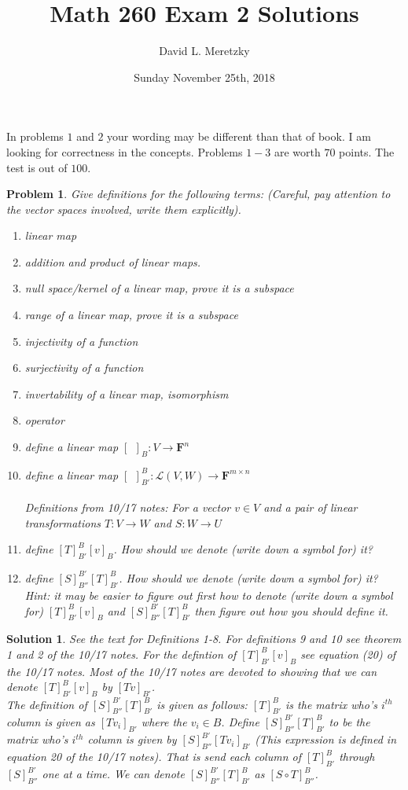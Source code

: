 \documentclass{article}
\title{ \vspace{-10ex} %
Math 260 Exam 2 Solutions
}
\author{David L. Meretzky
}
\date{%
Sunday November 25th, 2018
}
\theoremstyle{problemstyle}
\newtheorem{problem}{Problem}
\theoremstyle{problemstyle}
\newtheorem{solution}{Solution}
\theoremstyle{problemstyle}
\begin{document}
\maketitle

In problems $1$ and $2$ your wording may be different than that of book. I am looking for correctness in the concepts. Problems $1-3$ are worth $70$ points.  The test is out of $100$. 

\begin{problem}
Give definitions for the following terms: (Careful, pay attention to the vector spaces involved, write them explicitly). 
\begin{enumerate}
\item linear map
\item addition and product of linear maps.    
\item null space/kernel of a linear map, prove it is a subspace
\item range of a linear map, prove it is a subspace
\item injectivity of a function
\item surjectivity of a function
\item invertability of a linear map, isomorphism
\item operator
\item define a linear map $[ \ \ ]_B:V \rightarrow \textbf{F}^n$ 
\item define a linear map $[ \ \ ]_{B'}^B:\mathscr{L}(V,W) \rightarrow \textbf{F}^{m\times n}$\\\\
Definitions from 10/17 notes: For a vector $v \in V$ and a pair of linear transformations $T:V \rightarrow W$ and $S:W\rightarrow U$\\
\item define $[T]_{B'}^B[v]_B$. How should we denote (write down a symbol for) it?
\item define $[S]_{B''}^{B'}[T]_{B'}^B$. How should we denote (write down a symbol for) it?
Hint: it may be easier to figure out first how to denote (write down a symbol for) $[T]_{B'}^B[v]_B$ and $[S]_{B''}^{B'}[T]_{B'}^B$ then figure out how you should define it. 
\end{enumerate}
\end{problem}

\begin{solution}
See the text for Definitions 1-8. For definitions 9 and 10 see theorem 1 and 2 of the 10/17 notes. For the defintion of $[T]_{B'}^B[v]_B$ see equation (20) of the 10/17 notes. Most of the 10/17 notes are devoted to showing that we can denote $[T]_{B'}^B[v]_B$ by $[Tv]_{B'}$.\\

The definition of $[S]_{B''}^{B'}[T]_{B'}^B$ is given as follows: $[T]_{B'}^B$ is the matrix who's $i^{th}$ column is given as $[Tv_i]_{B'}$ where the $v_i \in B$. Define  $[S]_{B''}^{B'}[T]_{B'}^B$ to be the matrix who's $i^{th}$ column is given by $[S]_{B''}^{B'}[Tv_i]_{B'}$ (This expression is defined in equation 20 of the 10/17 notes). That is send each column of $[T]_{B'}^B$ through $[S]_{B''}^{B'}$ one at a time. We can denote $[S]_{B''}^{B'}[T]_{B'}^B$ as $[S\circ T]_{B''}^{B}$.  
\end{solution}
\end{document}

